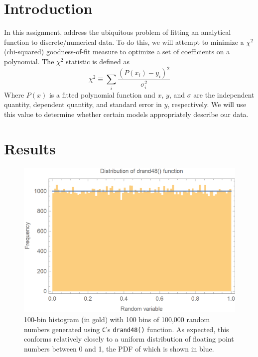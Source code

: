 \documentclass{article}
\author{\hwauthor}
\title{\hwtitle}
\date{\hwdate}
\begin{document}
\maketitle
\thispagestyle{fancy}

\section{Introduction}

In this assignment, address the ubiquitous problem of fitting an analytical function to discrete/numerical data. To do this, we will attempt to minimize a $\chi^2$ (chi-squared) goodness-of-fit measure to optimize a set of coefficients on a polynomial. The $\chi^2$ statistic is defined as \begin{equation*}
    \chi^2 \equiv \sum_i \frac{(P(x_i)-y_i)^2}{\sigma_i^2}
\end{equation*}
Where $P(x)$ is a fitted polynomial function and $x$, $y$, and $\sigma$ are the independent quantity, dependent quantity, and standard error in $y$, respectively. We will use this value to determine whether certain models appropriately describe our data.

\section{Results}

\bigskip
{}
\medskip

\begin{figure}[H]
    \centering
    \includegraphics[width=4.5in]{homework7/uniform_dist.png}
    \caption{100-bin histogram (in gold) with 100 bins of 100,000 random numbers generated using \texttt{C}'s \texttt{drand48()} function. As expected, this conforms relatively closely to a uniform distribution of floating point numbers between 0 and 1, the PDF of which is shown in blue.}
    \label{fig:drand48}
\end{figure}
\end{document}
